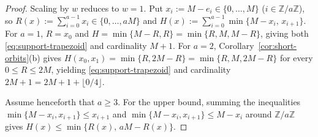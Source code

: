 \documentclass[preprint,12pt]{elsarticle}
\newcommand{\Z}{\mathbb Z}
\numberwithin{equation}{section}
\theoremstyle{plain}
\theoremstyle{definition}
\theoremstyle{remark}
\begin{document}
\begin{proof}
Scaling by $w$ reduces to $w=1$. Put $x_i:=M-e_i\in\{0,\dots,M\}$ ($i\in\Z/a\Z$),
so $R(x):=\sum_{i=0}^{a-1}x_i\in\{0,\dots,aM\}$ and
$H(x):=\sum_{i=0}^{a-1}\min\{M-x_i,\,x_{i+1}\}$. For $a=1$, $R=x_0$ and
$H=\min\{M-R,R\}=\min\{R,M,M-R\}$, giving both \eqref{eq:support-trapezoid} and
cardinality $M+1$. For $a=2$, Corollary~\ref{cor:short-orbits}\textup{(b)} gives
$H(x_0,x_1)=\min\{R,2M-R\}=\min\{R,M,2M-R\}$ for every $0\le R\le 2M$, yielding
\eqref{eq:support-trapezoid} and cardinality $2M+1=2M+1+\lfloor 0/4\rfloor$.

Assume henceforth that $a\ge 3$. For the upper bound, summing the inequalities
$\min\{M-x_i,x_{i+1}\}\le x_{i+1}$ and $\min\{M-x_i,x_{i+1}\}\le M-x_i$ around
$\Z/a\Z$ gives $H(x)\le\min\{R(x),\,aM-R(x)\}$.


\end{proof}
\end{document}
